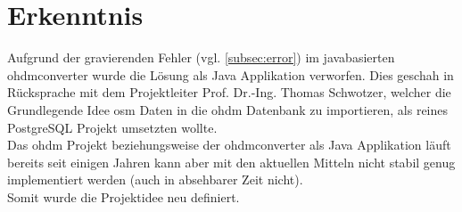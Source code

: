 \newpage
\section{Erkenntnis}
Aufgrund der gravierenden Fehler (vgl. \autoref{subsec:error}) im javabasierten \gls{ohdmconverter} wurde die Lösung als Java Applikation verworfen. Dies geschah in Rücksprache mit dem Projektleiter Prof. Dr.-Ing. Thomas Schwotzer, welcher die Grundlegende Idee \gls{osm} Daten in die \gls{ohdm} Datenbank zu importieren, als reines PostgreSQL Projekt umsetzten wollte.\\
Das \gls{ohdm} Projekt beziehungsweise der \gls{ohdmconverter} als Java Applikation läuft bereits seit einigen Jahren kann aber mit den aktuellen Mitteln nicht stabil genug implementiert werden (auch in absehbarer Zeit nicht).\\

Somit wurde die Projektidee neu definiert.